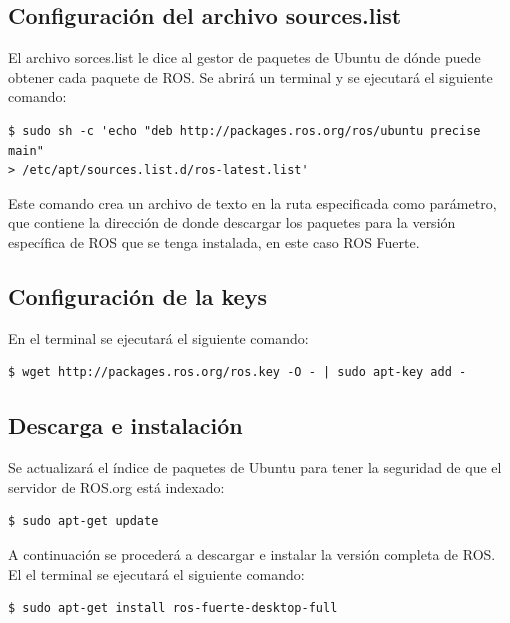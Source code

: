 \documentclass[12pt, a4paper]{report}
\begin{document}

\subsection{Configuración del archivo sources.list}

El archivo sorces.list le dice al gestor de paquetes de Ubuntu de dónde puede obtener cada paquete de ROS. Se abrirá un terminal y se ejecutará el siguiente comando:\\

\begin{verbatim}
$ sudo sh -c 'echo "deb http://packages.ros.org/ros/ubuntu precise main" 
> /etc/apt/sources.list.d/ros-latest.list'
\end{verbatim}

Este comando crea un archivo de texto en la ruta especificada como parámetro, que contiene la dirección de donde descargar los paquetes para la versión específica de ROS que se tenga instalada, en este caso ROS Fuerte.

\subsection{Configuración de la keys}

En el terminal se ejecutará el siguiente comando:

\begin{verbatim}
$ wget http://packages.ros.org/ros.key -O - | sudo apt-key add -
\end{verbatim}

\subsection{Descarga e instalación}

Se actualizará el índice de paquetes de Ubuntu para tener la seguridad de que el servidor de ROS.org está indexado:

\begin{verbatim}
$ sudo apt-get update
\end{verbatim}

A continuación se procederá a descargar e instalar la versión completa de ROS. El el terminal se ejecutará el siguiente comando:

\begin{verbatim}
$ sudo apt-get install ros-fuerte-desktop-full
\end{verbatim}
\end{document}
